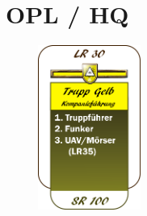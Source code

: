 \section{\acf{OPL} / \acf{HQ}}
\begin{figure}
	\centering 
	\includegraphics[width=0.3\textwidth]{./img/truppenordnung/opl/opl.png}
\end{figure}	

